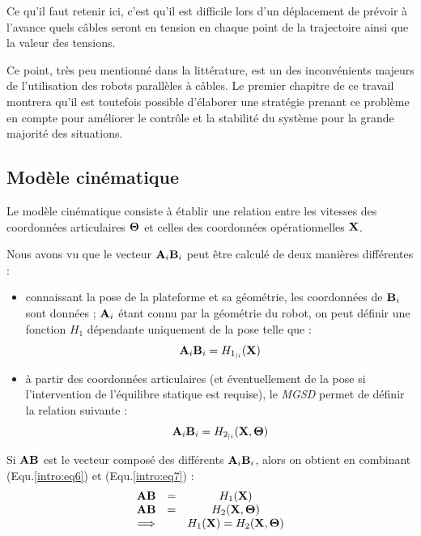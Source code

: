 Ce qu'il faut retenir ici, c'est qu'il est difficile lors d'un déplacement de prévoir à l'avance quels câbles seront en tension en chaque point de la trajectoire ainsi que la valeur des tensions.

Ce point, très peu mentionné dans la littérature, est un des inconvénients majeurs de l'utilisation des robots parallèles à câbles. Le premier chapitre de ce travail montrera qu'il est toutefois possible d'élaborer une stratégie prenant ce problème en compte pour améliorer le contrôle et la stabilité du système pour la grande majorité des situations.

\subsection{Modèle cinématique}

Le modèle cinématique consiste à établir une relation entre les vitesses des coordonnées articulaires ${\bf \Theta}$ et celles des coordonnées opérationnelles ${\bf X}$.

Nous avons vu que le vecteur ${\bf A}_i{\bf B}_i$ peut être calculé de deux manières différentes :
\begin{itemize}
 \item connaissant la pose de la plateforme et sa géométrie, les coordonnées de ${\bf B}_i$ sont données ; ${\bf A}_i$ étant connu par la géométrie du robot, on peut définir une fonction $H_1$ dépendante uniquement de la pose telle que :
\begin{equation}
{\bf A}_i{\bf B}_i = H_{1_{|i}}({\bf X})
\label{intro:eq6}
\end{equation}
 \item à partir des coordonnées articulaires (et éventuellement de la pose si l'intervention de l'équilibre statique est requise), le {\it MGSD} permet de définir la relation suivante :
\begin{equation}
{\bf A}_i{\bf B}_i = H_{2_{|i}}({\bf X}, {\bf \Theta})
\label{intro:eq7}
\end{equation}
\end{itemize}
 
Si ${\bf AB}$ est le vecteur composé des différents ${\bf A}_i{\bf B}_i$, alors on obtient en combinant (Equ.\ref{intro:eq6}) et (Equ.\ref{intro:eq7}) :
\begin{equation}
\begin{matrix}
{\bf AB} &=& H_1({\bf X}) \\
{\bf AB} &=& H_2({\bf X}, {\bf \Theta}) \\
\Longrightarrow & & H_1({\bf X}) = H_2({\bf X}, {\bf \Theta})
\end{matrix}
\label{intro:eq8}
\end{equation}

